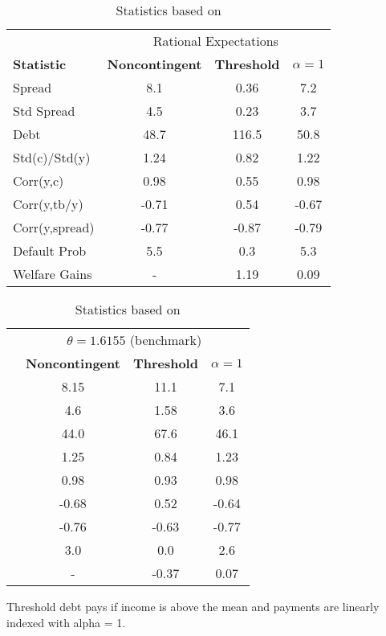  
  
\begin{table}[!hbtp]\centering\small
\caption{Statistics based on \citet{PouzoPresno2016}}  \label{table:PP}
\begin{tabular}{@{}lccc@{}}\toprule
  & \multicolumn{3}{c}{Rational Expectations} \\\cmidrule{2-4}
\textbf{Statistic} & \textbf{Noncontingent} & \textbf{Threshold} & $\alpha = 1$\\\midrule
Spread                   & 8.1            & 0.36            & 7.2           \\
Std Spread               & 4.5            & 0.23            & 3.7            \\
Debt                     & 48.7           & 116.5           & 50.8           \\
Std(c)/Std(y)            & 1.24           & 0.82           & 1.22           \\
Corr(y,c)                & 0.98           & 0.55           & 0.98           \\
Corr(y,tb/y)             & -0.71          & 0.54           & -0.67          \\
Corr(y,spread)           & -0.77          & -0.87           & -0.79          \\
Default Prob             & 5.5            & 0.3            & 5.3            \\
Welfare Gains            & -              & 1.19           & 0.09           \\
  \bottomrule
\end{tabular}%
\begin{tabular}{@{}lccc@{}}\toprule
& \multicolumn{3}{c}{$\theta = 1.6155$ (benchmark)} \\\cmidrule{2-4}
& \textbf{Noncontingent} & \textbf{Threshold} & $\alpha = 1$ \\\midrule
& 8.15           & 11.1           & 7.1           \\
& 4.6            & 1.58            & 3.6            \\
& 44.0           & 67.6           & 46.1           \\
& 1.25           & 0.84           & 1.23           \\
& 0.98           & 0.93           & 0.98           \\
& -0.68          & 0.52           & -0.64          \\
& -0.76          & -0.63          & -0.77          \\
& 3.0            & 0.0            & 2.6            \\
& -              & -0.37          & 0.07           \\
\bottomrule 
\end{tabular}
\begin{tablenotes1}
  Threshold debt pays if income is above the mean and payments are linearly indexed with alpha = 1.
\end{tablenotes1}
\end{table}
  
